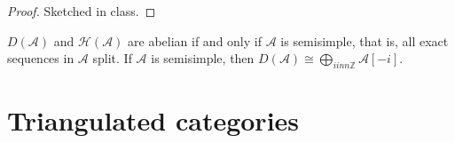 \begin{proof}
Sketched in class.
\end{proof}

\begin{exercise}
\label{dcos-label-010}
$D(\mathcal{A})$ and
$\mathcal{H}(\mathcal{A})$ are abelian if and
only if $\mathcal{A}$ is semisimple, that is,
all exact sequences in $\mathcal{A}$ split.
If $\mathcal{A}$ is semisimple, then
$D(\mathcal{A})\cong \bigoplus_{i inn
\mathbb{Z}}\mathcal{A}[-i]$.
\end{exercise}

\section{Triangulated categories}
\label{section-triangulated-categories}

